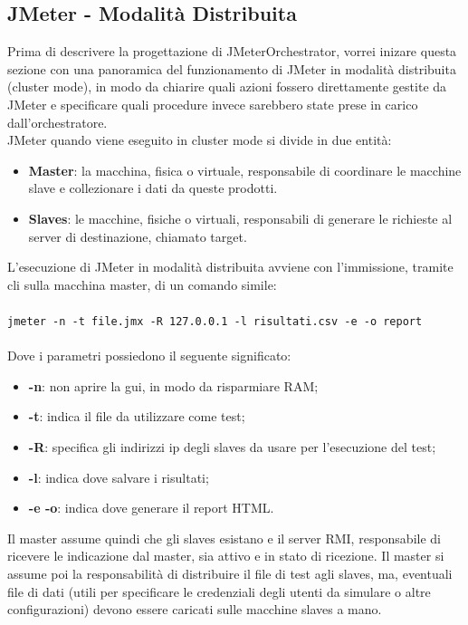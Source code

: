 \subsection{JMeter - Modalità Distribuita}
Prima di descrivere la progettazione di JMeterOrchestrator, vorrei inizare questa sezione con una panoramica del funzionamento di JMeter in modalità distribuita (cluster mode), in modo da chiarire quali azioni fossero direttamente gestite da JMeter e specificare quali procedure invece sarebbero state prese in carico dall'orchestratore. \\
JMeter quando viene eseguito in cluster mode si divide in due entità:
\begin{itemize}
	\item \textbf{Master}: la macchina, fisica o virtuale, responsabile di coordinare le macchine slave e collezionare i dati da queste prodotti.
	\item \textbf{Slaves}: le macchine, fisiche o virtuali, responsabili di generare le richieste al server di destinazione, chiamato target.
\end{itemize}
L'esecuzione di JMeter in modalità distribuita avviene con l'immissione, tramite \gls{cli} sulla macchina master, di un comando simile:\\\\
\texttt{jmeter -n -t file.jmx -R 127.0.0.1 -l risultati.csv -e -o report}\\\\
Dove i parametri possiedono il seguente significato:
\begin{itemize}
	\item \textbf{-n}: non aprire la \gls{gui}, in modo da risparmiare RAM;
	\item \textbf{-t}: indica il file da utilizzare come test;
	\item \textbf{-R}: specifica gli indirizzi ip degli slaves da usare per l'esecuzione del test;
	\item \textbf{-l}: indica dove salvare i risultati;
	\item \textbf{-e -o}: indica dove generare il report HTML.
\end{itemize}
Il master assume quindi che gli slaves esistano e il server RMI, responsabile di ricevere le indicazione dal master, sia attivo e in stato di ricezione. Il master si assume poi la responsabilità di distribuire il file di test agli slaves, ma, eventuali file di dati (utili per specificare le credenziali degli utenti da simulare o altre configurazioni) devono essere caricati sulle macchine slaves a mano.\\

